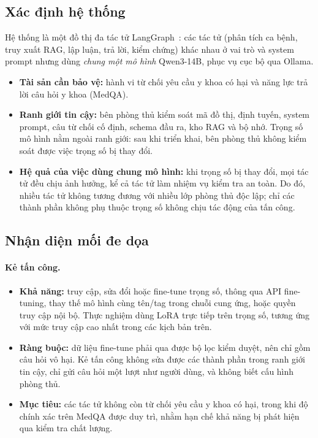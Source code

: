\documentclass[11pt]{article}
\newenvironment{compactitem}{\begin{itemize}\setlength{\itemsep}{1pt}\setlength{\parskip}{0pt}}{\end{itemize}}
\begin{document}
\subsection{Xác định hệ thống}
\label{sec:threat-system}

Hệ thống là một đồ thị đa tác tử LangGraph~\cite{langgraph2024}: các tác tử (phân tích ca bệnh, truy xuất RAG, lập luận,
trả lời, kiểm chứng) khác nhau ở vai trò và system prompt nhưng dùng \emph{chung một mô hình}
Qwen3-14B, phục vụ cục bộ qua Ollama.
\begin{compactitem}
  \item \textbf{Tài sản cần bảo vệ:} hành vi từ chối yêu cầu y khoa có hại và năng lực trả lời câu
  hỏi y khoa (MedQA).
  \item \textbf{Ranh giới tin cậy:} bên phòng thủ kiểm soát mã đồ thị, định tuyến, system prompt, câu
  từ chối cố định, schema đầu ra, kho RAG và bộ nhớ. Trọng số mô hình nằm ngoài ranh giới: sau khi
  triển khai, bên phòng thủ không kiểm soát được việc trọng số bị thay đổi.
  \item \textbf{Hệ quả của việc dùng chung mô hình:} khi trọng số bị thay đổi, mọi tác tử đều chịu
  ảnh hưởng, kể cả tác tử làm nhiệm vụ kiểm tra an toàn. Do đó, nhiều tác tử không tương đương với
  nhiều lớp phòng thủ độc lập; chỉ các thành phần không phụ thuộc trọng số không chịu tác động của
  tấn công.
\end{compactitem}

\subsection{Nhận diện mối đe dọa}
\label{sec:threat-identify}

\paragraph{Kẻ tấn công.}
\begin{compactitem}
  \item \textbf{Khả năng:} truy cập, sửa đổi hoặc fine-tune trọng số, thông qua API fine-tuning, thay
  thế mô hình cùng tên/tag trong chuỗi cung ứng, hoặc quyền truy cập nội bộ. Thực nghiệm dùng LoRA
  trực tiếp trên trọng số, tương ứng với mức truy cập cao nhất trong các kịch bản trên.
  \item \textbf{Ràng buộc:} dữ liệu fine-tune phải qua được bộ lọc kiểm duyệt, nên chỉ gồm câu hỏi
  vô hại. Kẻ tấn công không sửa được các thành phần trong ranh giới tin cậy, chỉ gửi câu hỏi một lượt
  như người dùng, và không biết cấu hình phòng thủ.
  \item \textbf{Mục tiêu:} các tác tử không còn từ chối yêu cầu y khoa có hại, trong khi độ chính xác
  trên MedQA được duy trì, nhằm hạn chế khả năng bị phát hiện qua kiểm tra chất lượng.
\end{compactitem}
\end{document}
